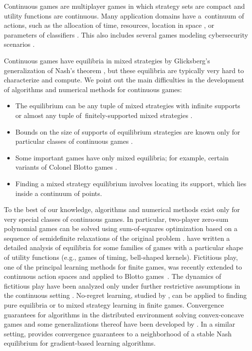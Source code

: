 Continuous games are multiplayer games in which strategy sets are compact and utility functions are continuous. Many application domains have a~continuum of actions, such as the allocation of time, resources, location in space \cite{Kamra18}, or parameters of classifiers \cite{Loiseau19}. This also includes several games modeling cybersecurity scenarios \cite{Niu2021,Loiseau19,roussillon2021scalable}.

Continuous games have equilibria in mixed strategies by Glicksberg's generalization of Nash's theorem \cite{Glicksberg52}, but these equilibria are typically very hard to characterize and compute. We point out the main difficulties in the development of algorithms and numerical methods for continuous games:
\begin{itemize}
  \item The equilibrium can be any tuple of mixed strategies with infinite supports~\cite{Karlin59} or almost any tuple of~finitely-supported mixed strategies \cite{Rehbeck18}.
  \item Bounds on the size of supports of equilibrium strategies are known only for particular classes of continuous games \cite{stein.ozdaglar.ea:separable}.
  \item Some important games have only mixed equilibria; for example, certain variants of Colonel Blotto games \cite{Golman2009}.
  \item Finding a mixed strategy equilibrium involves locating its support, which lies inside a continuum of points.
\end{itemize}

To the best of our knowledge, algorithms and numerical methods exist only for very special classes of continuous games. In particular, two-player zero-sum polynomial games can be solved using sum-of-squares optimization based on a sequence of semidefinite relaxations of the original problem \cite{parrilo:polynomial,LarakiLasserre12}. \textcite{BasarOlsder99} have written a detailed analysis of equilibria for some families of games with a particular shape of utility functions (e.g., games of timing, bell-shaped kernels). Fictitious play, one of the principal learning methods for finite games, was recently extended to continuous action spaces and applied to Blotto games~\cite{Ganzfried21}. The dynamics of fictitious play have been analyzed only under further restrictive assumptions in the continuous setting \cite{Hofbauer06}. No-regret learning, studied by \textcite{Mertikopoulos2019}, can be applied to finding pure equilibria or to mixed strategy learning in finite games. Convergence guarantees for algorithms in the distributed environment solving convex-concave games and some generalizations thereof have been developed by \textcite{mertikopoulos.lecouat.ea:optimistic}. In a similar setting, \textcite{chasnov.ratliff.ea:convergence} provides convergence guarantees to a neighborhood of a stable Nash equilibrium for gradient-based learning algorithms.
